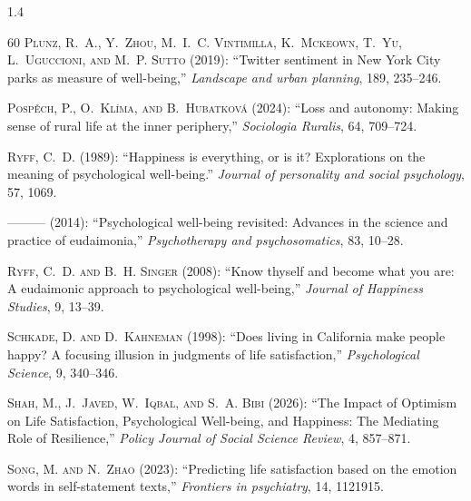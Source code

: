 \documentclass[10pt, letterpaper]{article}
\begin{document}
\begin{spacing}{1.4}
\begin{thebibliography}{60}
\textsc{Plunz, R.~A., Y.~Zhou, M.~I.~C. Vintimilla, K.~Mckeown, T.~Yu,
  L.~Uguccioni, and M.~P. Sutto} (2019): \enquote{Twitter sentiment in New York
  City parks as measure of well-being,} \emph{Landscape and urban planning},
  189, 235--246.

\textsc{Posp{\v{e}}ch, P., O.~Kl{\'\i}ma, and B.~Hubatkov{\'a}} (2024):
  \enquote{Loss and autonomy: Making sense of rural life at the inner
  periphery,} \emph{Sociologia Ruralis}, 64, 709--724.

\textsc{Ryff, C.~D.} (1989): \enquote{Happiness is everything, or is it?
  Explorations on the meaning of psychological well-being.} \emph{Journal of
  personality and social psychology}, 57, 1069.

---\hspace{-.1pt}---\hspace{-.1pt}--- (2014): \enquote{Psychological well-being
  revisited: Advances in the science and practice of eudaimonia,}
  \emph{Psychotherapy and psychosomatics}, 83, 10--28.

\textsc{Ryff, C.~D. and B.~H. Singer} (2008): \enquote{Know thyself and become
  what you are: A eudaimonic approach to psychological well-being,}
  \emph{Journal of Happiness Studies}, 9, 13--39.

\textsc{Schkade, D. and D.~Kahneman} (1998): \enquote{Does living in California
  make people happy? A focusing illusion in judgments of life satisfaction,}
  \emph{Psychological Science}, 9, 340--346.

\textsc{Shah, M., J.~Javed, W.~Iqbal, and S.~A. Bibi} (2026): \enquote{The
  Impact of Optimism on Life Satisfaction, Psychological Well-being, and
  Happiness: The Mediating Role of Resilience,} \emph{Policy Journal of Social
  Science Review}, 4, 857--871.

\textsc{Song, M. and N.~Zhao} (2023): \enquote{Predicting life satisfaction
  based on the emotion words in self-statement texts,} \emph{Frontiers in
  psychiatry}, 14, 1121915.


\end{thebibliography}
\end{spacing}
\end{document}
